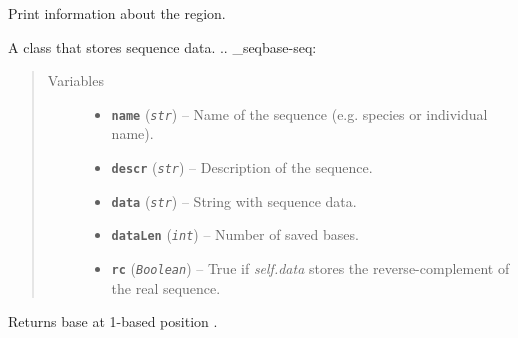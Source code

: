 \documentclass[letterpaper,10pt,english]{sphinxmanual}
\begin{document}
\begin{fulllineitems}
\begin{quote}
\begin{description}
\begin{itemize}
\end{itemize}

\end{description}\end{quote}

\begin{fulllineitems}
\label{seqbase:libPoMo.seqbase.Region.print_info}
Print information about the region.

\end{fulllineitems}


\end{fulllineitems}


\begin{fulllineitems}
\label{seqbase:libPoMo.seqbase.Seq}
A class that stores sequence data.
.. \_seqbase-seq:
\begin{quote}\begin{description}
\item[{Variables}] \leavevmode\begin{itemize}
\item {} 
\textbf{\texttt{name}} (\emph{\texttt{str}}) -- Name of the sequence (e.g. species or individual
name).

\item {} 
\textbf{\texttt{descr}} (\emph{\texttt{str}}) -- Description of the sequence.

\item {} 
\textbf{\texttt{data}} (\emph{\texttt{str}}) -- String with sequence data.

\item {} 
\textbf{\texttt{dataLen}} (\emph{\texttt{int}}) -- Number of saved bases.

\item {} 
\textbf{\texttt{rc}} (\emph{\texttt{Boolean}}) -- True if \emph{self.data} stores the
reverse-complement of the real sequence.

\end{itemize}

\end{description}\end{quote}

\begin{fulllineitems}
\label{seqbase:libPoMo.seqbase.Seq.get_base}
Returns base at 1-based position .


\end{fulllineitems}
\end{fulllineitems}
\end{document}
